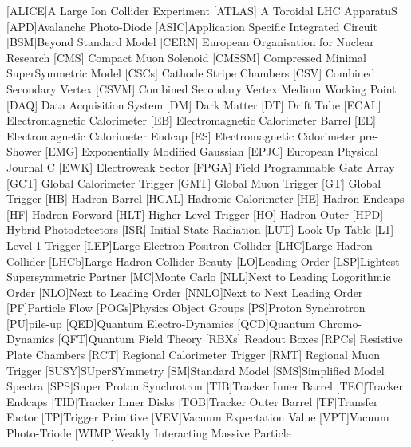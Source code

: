 \begin{acronym}[AAAAAAA]
[ALICE]{A Large Ion Collider Experiment}
 [ATLAS] {A Toroidal LHC ApparatuS}
[APD]{Avalanche Photo-Diode}
[ASIC]{Application Specific Integrated Circuit}
[BSM]{Beyond Standard Model}
 [CERN] {European Organisation for Nuclear Research}
 [CMS] {Compact Muon Solenoid}
 [CMSSM] {Compressed Minimal SuperSymmetric Model}
 [CSCs] {Cathode Stripe Chambers}
 [CSV] {Combined Secondary Vertex}
 [CSVM] {Combined Secondary Vertex Medium Working Point}
 [DAQ] {Data Acquisition System}
 [DM] {Dark Matter}
 [DT] {Drift Tube}
 [ECAL] {Electromagnetic Calorimeter}
 [EB] {Electromagnetic Calorimeter Barrel}
 [EE] {Electromagnetic Calorimeter Endcap}
 [ES] {Electromagnetic Calorimeter pre-Shower}
 [EMG] {Exponentially Modified Gaussian}
 [EPJC] {European Physical Journal C}
 [EWK] {Electroweak Sector}
 [FPGA] {Field Programmable Gate Array}
 [GCT] {Global Calorimeter Trigger}
 [GMT] {Global Muon Trigger}
 [GT] {Global Trigger}
 [HB] {Hadron Barrel}
 [HCAL] {Hadronic Calorimeter}
 [HE] {Hadron Endcaps}
 [HF] {Hadron Forward}
[HLT] {Higher Level Trigger}
 [HO] {Hadron Outer}
 [HPD] {Hybrid Photodetectors}
 [ISR] {Initial State Radiation}
 [LUT] {Look Up Table}
 [L1] {Level 1 Trigger}
[LEP]{Large Electron-Positron Collider}
[LHC]{Large Hadron Collider}
[LHCb]{Large Hadron Collider Beauty}
[LO]{Leading Order}
[LSP]{Lightest Supersymmetric Partner}
[MC]{Monte Carlo}
[NLL]{Next to Leading Logorithmic Order}
[NLO]{Next to Leading Order}
[NNLO]{Next to Next Leading Order}
[PF]{Particle Flow}
[POGs]{Physics Object Groups}
[PS]{Proton Synchrotron}
[PU]{pile-up}
[QED]{Quantum Electro-Dynamics}
[QCD]{Quantum Chromo-Dynamics}
[QFT]{Quantum Field Theory}
 [RBXs] {Readout Boxes}
 [RPCs] {Resistive Plate Chambers}
 [RCT] {Regional Calorimeter Trigger}
 [RMT] {Regional Muon Trigger}
[SUSY]{SUperSYmmetry}
[SM]{Standard Model}
[SMS]{Simplified Model Spectra}
[SPS]{Super Proton Synchrotron}
[TIB]{Tracker Inner Barrel} 
[TEC]{Tracker Endcaps} 
[TID]{Tracker Inner Disks}
[TOB]{Tracker Outer Barrel} 
[TF]{Transfer Factor}
[TP]{Trigger Primitive}
[VEV]{Vacuum Expectation Value}
[VPT]{Vacuum Photo-Triode}
[WIMP]{Weakly Interacting Massive Particle}

\end{acronym}

